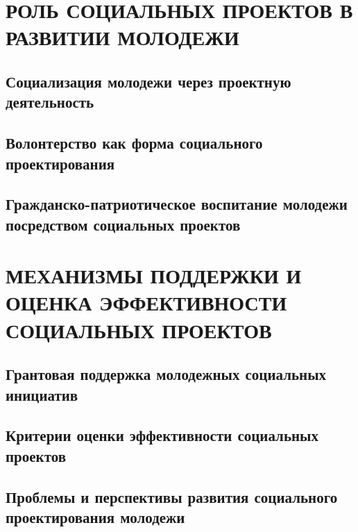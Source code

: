 \documentclass[14pt,a4paper]{extarticle}
\begin{document}

\newpage
\section{РОЛЬ СОЦИАЛЬНЫХ ПРОЕКТОВ В РАЗВИТИИ МОЛОДЕЖИ}

\subsection{Социализация молодежи через проектную деятельность}


\subsection{Волонтерство как форма социального проектирования}


\subsection{Гражданско-патриотическое воспитание молодежи посредством социальных проектов}


\newpage
\section{МЕХАНИЗМЫ ПОДДЕРЖКИ И ОЦЕНКА ЭФФЕКТИВНОСТИ СОЦИАЛЬНЫХ ПРОЕКТОВ}

\subsection{Грантовая поддержка молодежных социальных инициатив}


\subsection{Критерии оценки эффективности социальных проектов}


\subsection{Проблемы и перспективы развития социального проектирования молодежи}
\end{document}
